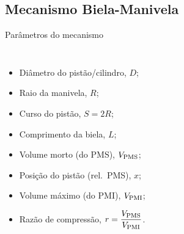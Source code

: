 \subsection{Mecanismo Biela-Manivela}

    \begin{frame}{Parâmetros do mecanismo}\vspace*{-2em}
        \begin{columns}
        \begin{itemize}
            \item<1-> \alert{Diâmetro} do pistão/cilindro, \alert{$D$};
            \item<2-> \alert{Raio} da manivela, \alert{$R$};
            \item<3-> \alert{Curso} do pistão, \alert{$S = 2R$};
            \item<4-> \alert{Comprimento} da biela, \alert{$L$};
            \item<5-> \alert{Volume} morto (do PMS), \alert{${V_{\mathrm{PMS}}}$};
            \item<6-> \alert{Posição} do pistão (rel.~PMS), \alert{$x$};
            \item<7-> \alert{Volume} máximo (do PMI), \alert{${V_{\mathrm{PMI}}}$};
            \item<8-> \alert{Razão de compressão}, \alert{$r = \dfrac{{V_{\mathrm{PMS}}}}{{V_{\mathrm{PMI}}}}$}.
        \end{itemize}
        \begin{center}
        \end{center}
        \end{columns}
    \end{frame}


